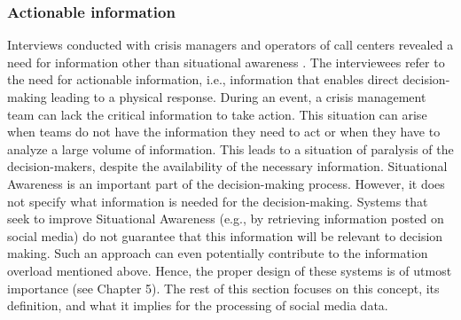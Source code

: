 \subsubsection{Actionable information}
Interviews conducted with crisis managers and operators of call centers revealed a need for information other than situational awareness \parencite{zadeSituationalAwarenessActionability2018, kropczynskiIdentifyingActionableInformation2018}.
The interviewees refer to the need for actionable information, i.e., information that enables direct decision-making leading to a physical response.
During an event, a crisis management team can lack the critical information to take action.
This situation can arise when teams do not have the information they need to act or when they have to analyze a large volume of information.
This leads to a situation of paralysis of the decision-makers, despite the availability of the necessary information.
Situational Awareness is an important part of the decision-making process.
However, it does not specify what information is needed for the decision-making.
Systems that seek to improve Situational Awareness (e.g., by retrieving information posted on social media) do not guarantee that this information will be relevant to decision making.
Such an approach can even potentially contribute to the information overload mentioned above.
Hence, the proper design of these systems is of utmost importance (see Chapter 5).
The rest of this section focuses on this concept, its definition, and what it implies for the processing of social media data.

